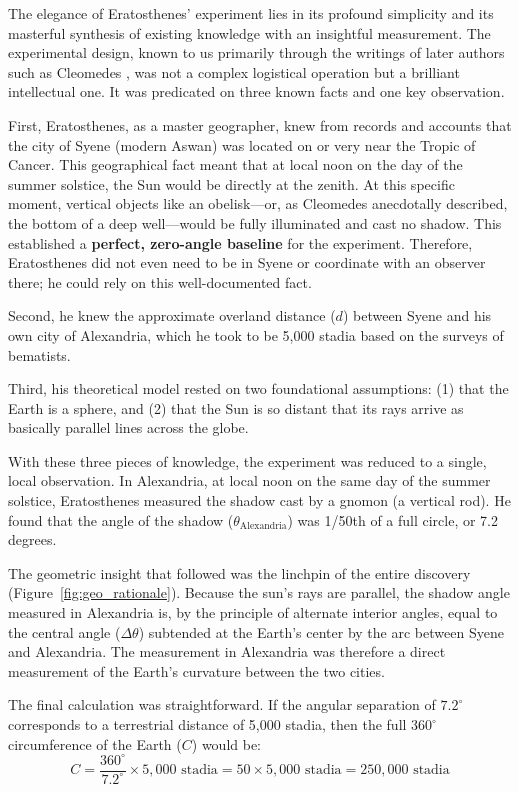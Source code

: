 \documentclass[11pt]{article}
\begin{document}
The elegance of Eratosthenes' experiment lies in its profound simplicity and its masterful synthesis of existing knowledge with an insightful measurement. The experimental design, known to us primarily through the writings of later authors such as Cleomedes \cite{Cleomedes1990}, was not a complex logistical operation but a brilliant intellectual one. It was predicated on three known facts and one key observation.

First, Eratosthenes, as a master geographer, knew from records and accounts that the city of Syene (modern Aswan) was located on or very near the Tropic of Cancer. This geographical fact meant that at local noon on the day of the summer solstice, the Sun would be directly at the zenith. At this specific moment, vertical objects like an obelisk—or, as Cleomedes anecdotally described, the bottom of a deep well—would be fully illuminated and cast no shadow. This established a \textbf{perfect, zero-angle baseline} for the experiment. Therefore, Eratosthenes did not even need to be in Syene or coordinate with an observer there; he could rely on this well-documented fact.

Second, he knew the approximate overland distance ($d$) between Syene and his own city of Alexandria, which he took to be 5,000 stadia based on the surveys of bematists.

Third, his theoretical model rested on two foundational assumptions: (1) that the Earth is a sphere, and (2) that the Sun is so distant that its rays arrive as basically parallel lines across the globe.

With these three pieces of knowledge, the experiment was reduced to a single, local observation. In Alexandria, at local noon on the same day of the summer solstice, Eratosthenes measured the shadow cast by a gnomon (a vertical rod). He found that the angle of the shadow ($\theta_{\text{Alexandria}}$) was 1/50th of a full circle, or 7.2 degrees.

The geometric insight that followed was the linchpin of the entire discovery (Figure~\ref{fig:geo_rationale}). Because the sun's rays are parallel, the shadow angle measured in Alexandria is, by the principle of alternate interior angles, equal to the central angle ($\Delta\theta$) subtended at the Earth's center by the arc between Syene and Alexandria. The measurement in Alexandria was therefore a direct measurement of the Earth's curvature between the two cities.

The final calculation was straightforward. If the angular separation of $7.2^\circ$ corresponds to a terrestrial distance of 5,000 stadia, then the full $360^\circ$ circumference of the Earth ($C$) would be:
\[
C = \frac{360^\circ}{7.2^\circ} \times 5,000 \text{ stadia} = 50 \times 5,000 \text{ stadia} = 250,000 \text{ stadia}
\]
\end{document}
